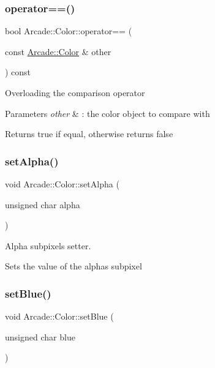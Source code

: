 \subsubsection{\texorpdfstring{operator==()}{operator==()}}
{\footnotesize\ttfamily bool Arcade\+::\+Color\+::operator== (\begin{DoxyParamCaption}\item[{const \hyperlink{class_arcade_1_1_color}{Arcade\+::\+Color} \&}]{other }\end{DoxyParamCaption}) const}

Overloading the comparison operator 
\begin{DoxyParams}{Parameters}
{\em other} & \+: the color object to compare with \\
\hline
\end{DoxyParams}
\begin{DoxyReturn}{Returns}
true if equal, otherwise returns false 
\end{DoxyReturn}
\mbox{\label{class_arcade_1_1_color_af73b2d743e93b65c5970b77dfe5bcb77}} 
\subsubsection{\texorpdfstring{set\+Alpha()}{setAlpha()}}
{\footnotesize\ttfamily void Arcade\+::\+Color\+::set\+Alpha (\begin{DoxyParamCaption}\item[{unsigned char}]{alpha }\end{DoxyParamCaption})}



Alpha subpixel\textquotesingle{}s setter. 

Sets the value of the alpha\textquotesingle{}s subpixel \mbox{\label{class_arcade_1_1_color_ad3032a60897b95c4f7043070d33ba3ae}} 
\subsubsection{\texorpdfstring{set\+Blue()}{setBlue()}}
{\footnotesize\ttfamily void Arcade\+::\+Color\+::set\+Blue (\begin{DoxyParamCaption}\item[{unsigned char}]{blue }\end{DoxyParamCaption})}



